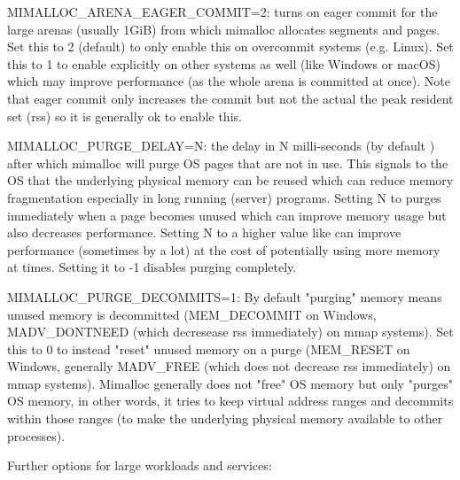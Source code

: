 \begin{DoxyItemize}
\item {\ttfamily MIMALLOC\+\_\+\+ARENA\+\_\+\+EAGER\+\_\+\+COMMIT=2}\+: turns on eager commit for the large arenas (usually 1GiB) from which mimalloc allocates segments and pages. Set this to 2 (default) to only enable this on overcommit systems (e.\+g. Linux). Set this to 1 to enable explicitly on other systems as well (like Windows or mac\+OS) which may improve performance (as the whole arena is committed at once). Note that eager commit only increases the commit but not the actual the peak resident set (rss) so it is generally ok to enable this.
\item {\ttfamily MIMALLOC\+\_\+\+PURGE\+\_\+\+DELAY=N}\+: the delay in {\ttfamily N} milli-\/seconds (by default {}) after which mimalloc will purge OS pages that are not in use. This signals to the OS that the underlying physical memory can be reused which can reduce memory fragmentation especially in long running (server) programs. Setting {\ttfamily N} to {} purges immediately when a page becomes unused which can improve memory usage but also decreases performance. Setting {\ttfamily N} to a higher value like {} can improve performance (sometimes by a lot) at the cost of potentially using more memory at times. Setting it to {\ttfamily -\/1} disables purging completely.
\item {\ttfamily MIMALLOC\+\_\+\+PURGE\+\_\+\+DECOMMITS=1}\+: By default "{}purging"{} memory means unused memory is decommitted ({\ttfamily MEM\+\_\+\+DECOMMIT} on Windows, {\ttfamily MADV\+\_\+\+DONTNEED} (which decresease rss immediately) on {\ttfamily mmap} systems). Set this to 0 to instead "{}reset"{} unused memory on a purge ({\ttfamily MEM\+\_\+\+RESET} on Windows, generally {\ttfamily MADV\+\_\+\+FREE} (which does not decrease rss immediately) on {\ttfamily mmap} systems). Mimalloc generally does not "{}free"{} OS memory but only "{}purges"{} OS memory, in other words, it tries to keep virtual address ranges and decommits within those ranges (to make the underlying physical memory available to other processes).
\end{DoxyItemize}

Further options for large workloads and services\+:


